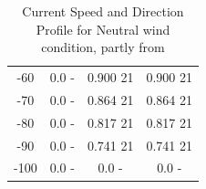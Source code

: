 \begin{table} [H]
\begin{tabular}{ |c|c|c|c|}
  -60 & 0.0 \hspace{0.7cm} - & 0.900 \hspace{0.7cm} 21  & 0.900 \hspace{1.15cm} 21 \\
 -70 & 0.0 \hspace{0.7cm} - & 0.864 \hspace{0.7cm} 21  & 0.864 \hspace{1.15cm} 21 \\
  -80 & 0.0 \hspace{0.7cm} - & 0.817 \hspace{0.7cm} 21  & 0.817 \hspace{1.15cm} 21 \\
 -90 & 0.0 \hspace{0.7cm} - & 0.741 \hspace{0.7cm} 21  & 0.741 \hspace{1.15cm} 21 \\ 
 -100 & 0.0 \hspace{0.7cm} - & 0.0 \hspace{0.7cm} -  & 0.0 \hspace{1.15cm} - \\ 
 \hline
\end{tabular}
\caption{Current Speed and Direction Profile for Neutral wind condition, partly from \cite{Lifes50+D1.1}}
\label{table:tidcur}
\end{table}   

